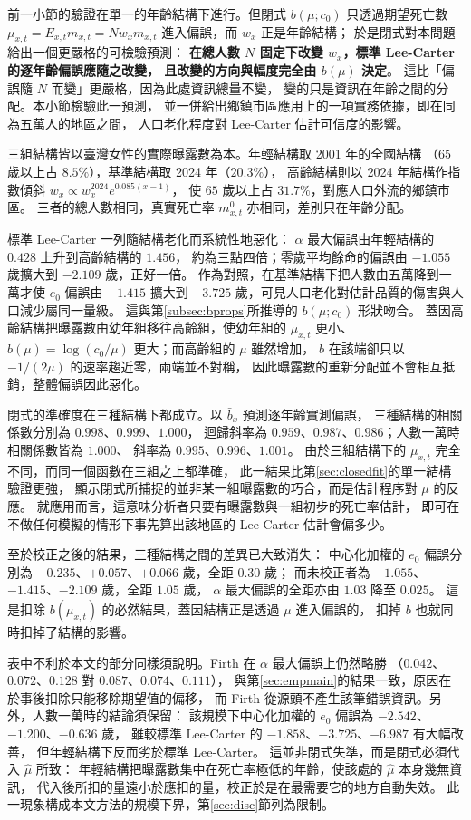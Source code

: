 \documentclass[UTF8, fontset=macnew, a4paper, 12pt]{ctexart}
\begin{document}
前一小節的驗證在單一的年齡結構下進行。但閉式 $b(\mu;c_0)$ 只透過期望死亡數
$\mu_{x,t}=E_{x,t}m_{x,t}=N w_x m_{x,t}$ 進入偏誤，而 $w_x$ 正是年齡結構；
於是閉式對本問題給出一個更嚴格的可檢驗預測：
\textbf{在總人數 $N$ 固定下改變 $w_x$，標準 Lee-Carter 的逐年齡偏誤應隨之改變，
且改變的方向與幅度完全由 $b(\mu)$ 決定}。
這比「偏誤隨 $N$ 而變」更嚴格，因為此處資訊總量不變，
變的只是資訊在年齡之間的分配。本小節檢驗此一預測，
並一併給出鄉鎮市區應用上的一項實務依據，即在同為五萬人的地區之間，
人口老化程度對 Lee-Carter 估計可信度的影響。

三組結構皆以臺灣女性的實際曝露數為本。年輕結構取 2001 年的全國結構
（$65$ 歲以上占 $8.5\%$），基準結構取 2024 年（$20.3\%$），
高齡結構則以 2024 年結構作指數傾斜 $w_x\propto w_x^{2024}e^{0.085(x-1)}$，
使 $65$ 歲以上占 $31.7\%$，對應人口外流的鄉鎮市區。
三者的總人數相同，真實死亡率 $m^{0}_{x,t}$ 亦相同，差別只在年齡分配。

標準 Lee-Carter 一列隨結構老化而系統性地惡化：
$\alpha$ 最大偏誤由年輕結構的 $0.428$ 上升到高齡結構的 $1.456$，
約為三點四倍；零歲平均餘命的偏誤由 $-1.055$ 歲擴大到 $-2.109$ 歲，正好一倍。
作為對照，在基準結構下把人數由五萬降到一萬才使 $e_0$ 偏誤由 $-1.415$
擴大到 $-3.725$ 歲，可見人口老化對估計品質的傷害與人口減少屬同一量級。
這與第\ref{subsec:bprops}所推導的 $b(\mu;c_0)$ 形狀吻合。
蓋因高齡結構把曝露數由幼年組移往高齡組，使幼年組的 $\mu_{x,t}$ 更小、
$b(\mu)=\log(c_0/\mu)$ 更大；而高齡組的 $\mu$ 雖然增加，
$b$ 在該端卻只以 $-1/(2\mu)$ 的速率趨近零，兩端並不對稱，
因此曝露數的重新分配並不會相互抵銷，整體偏誤因此惡化。

閉式的準確度在三種結構下都成立。以 $\bar b_x$ 預測逐年齡實測偏誤，
三種結構的相關係數分別為 $0.998$、$0.999$、$1.000$，
迴歸斜率為 $0.959$、$0.987$、$0.986$；人數一萬時相關係數皆為 $1.000$、
斜率為 $0.995$、$0.996$、$1.001$。
由於三組結構下的 $\mu_{x,t}$ 完全不同，而同一個函數在三組之上都準確，
此一結果比第\ref{sec:closedfit}的單一結構驗證更強，
顯示閉式所捕捉的並非某一組曝露數的巧合，而是估計程序對 $\mu$ 的反應。
就應用而言，這意味分析者只要有曝露數與一組初步的死亡率估計，
即可在不做任何模擬的情形下事先算出該地區的 Lee-Carter 估計會偏多少。

至於校正之後的結果，三種結構之間的差異已大致消失：
中心化加權的 $e_0$ 偏誤分別為 $-0.235$、$+0.057$、$+0.066$ 歲，全距 $0.30$ 歲；
而未校正者為 $-1.055$、$-1.415$、$-2.109$ 歲，全距 $1.05$ 歲，
$\alpha$ 最大偏誤的全距亦由 $1.03$ 降至 $0.025$。
這是扣除 $b(\mu_{x,t})$ 的必然結果，蓋因結構正是透過 $\mu$ 進入偏誤的，
扣掉 $b$ 也就同時扣掉了結構的影響。

表中不利於本文的部分同樣須說明。Firth 在 $\alpha$ 最大偏誤上仍然略勝
（$0.042$、$0.072$、$0.128$ 對 $0.087$、$0.074$、$0.111$），
與第\ref{sec:empmain}的結果一致，原因在於事後扣除只能移除期望值的偏移，
而 Firth 從源頭不產生該筆錯誤資訊。另外，人數一萬時的結論須保留：
該規模下中心化加權的 $e_0$ 偏誤為 $-2.542$、$-1.200$、$-0.636$ 歲，
雖較標準 Lee-Carter 的 $-1.858$、$-3.725$、$-6.987$ 有大幅改善，
但年輕結構下反而劣於標準 Lee-Carter。
這並非閉式失準，而是閉式必須代入 $\hat\mu$ 所致：
年輕結構把曝露數集中在死亡率極低的年齡，使該處的 $\hat\mu$ 本身幾無資訊，
代入後所扣的量遠小於應扣的量，校正於是在最需要它的地方自動失效。
此一現象構成本文方法的規模下界，第\ref{sec:disc}節列為限制。
\end{document}
